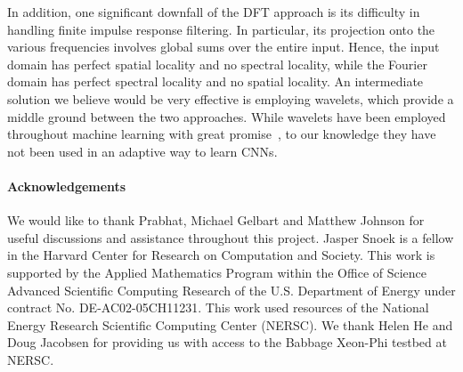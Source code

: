 \documentclass{article} \usepackage{nips15submit_e,times}
\begin{document}
In addition, one significant downfall of the DFT approach is its difficulty in handling finite impulse response filtering. In particular, its projection onto the various frequencies involves global sums over the entire input. Hence, the input domain has perfect spatial locality and no spectral locality, while the Fourier domain has perfect spectral locality and no spatial locality. An intermediate solution we believe would be very effective is employing wavelets, which provide a middle ground between the two approaches. While wavelets have been employed throughout machine learning with great promise~\citep{bruna-2013,oyallon-2013}, to our knowledge they have not been used in an adaptive way to learn CNNs.


\paragraph{Acknowledgements} We would like to thank Prabhat, Michael Gelbart and Matthew Johnson for useful discussions and assistance throughout this project. Jasper Snoek is a fellow in the Harvard Center for Research on Computation and Society. This work is supported by the Applied Mathematics Program within the Office of Science Advanced Scientific Computing Research of the U.S. Department of Energy under contract No. DE-AC02-05CH11231. This work used resources of the National Energy Research Scientific Computing Center (NERSC). We thank Helen He and Doug Jacobsen for providing us with access to the Babbage Xeon-Phi testbed at NERSC.

\small


\end{document}
